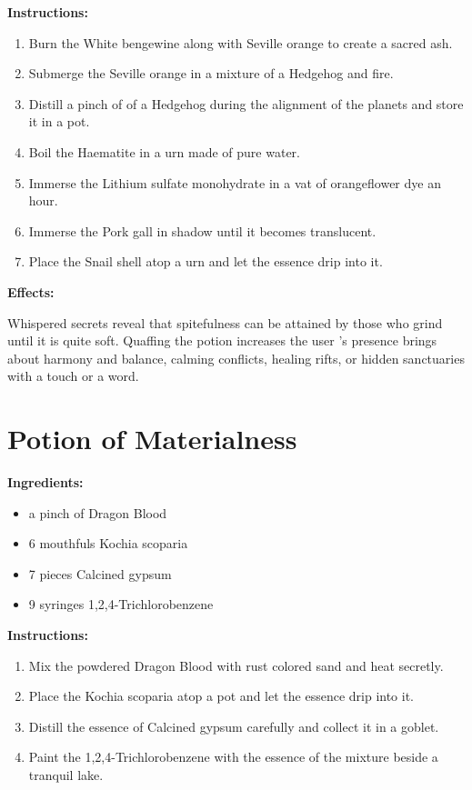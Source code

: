 \documentclass{article}
\begin{document}
\textbf{Instructions:}

\begin{enumerate}
  \item Burn the White bengewine along with Seville orange to create a sacred ash.
  \item Submerge the Seville orange in a mixture of a Hedgehog and fire.
  \item Distill a pinch of of a Hedgehog during the alignment of the planets and store it in a pot.
  \item Boil the Haematite in a urn made of pure water.
  \item Immerse the Lithium sulfate monohydrate in a vat of orangeflower dye an hour.
  \item Immerse the Pork gall in shadow until it becomes translucent.
  \item Place the Snail shell atop a urn and let the essence drip into it.
\end{enumerate}

\textbf{Effects:}

Whispered secrets reveal that spitefulness can be attained by those who grind until it is quite soft. Quaffing the potion increases the user 's presence brings about harmony and balance, calming conflicts, healing rifts, or hidden sanctuaries with a touch or a word.

\newpage
\section*{Potion of Materialness}

\textbf{Ingredients:}

\begin{itemize}
  \item a pinch of Dragon Blood
  \item 6 mouthfuls Kochia scoparia
  \item 7 pieces Calcined gypsum
  \item 9 syringes 1,2,4-Trichlorobenzene
\end{itemize}

\textbf{Instructions:}

\begin{enumerate}
  \item Mix the powdered Dragon Blood with rust colored sand and heat secretly.
  \item Place the Kochia scoparia atop a pot and let the essence drip into it.
  \item Distill the essence of Calcined gypsum carefully and collect it in a goblet.
  \item Paint the 1,2,4-Trichlorobenzene with the essence of the mixture beside a tranquil lake.
\end{enumerate}
\end{document}
